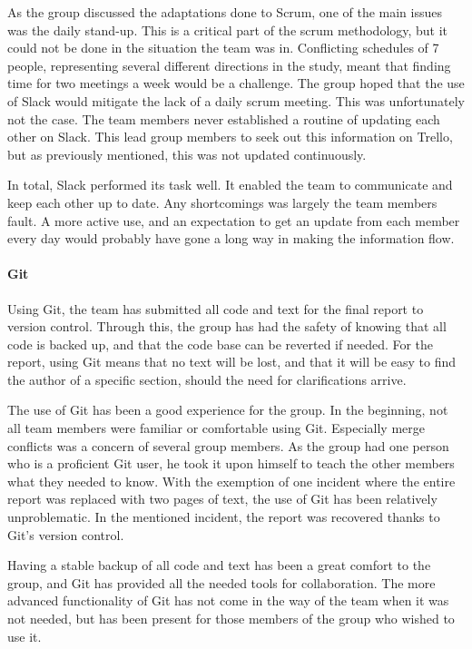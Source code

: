 \documentclass[11pt,a4paper,titlepage,oneside]{report}
\begin{document}
As the group discussed the adaptations done to Scrum, one of the main issues was the daily stand-up. This is a critical part of the scrum methodology, but it could not be done in the situation the team was in. Conflicting schedules of 7 people, representing several different directions in the study, meant that finding time for two meetings a week would be a challenge. The group hoped that the use of Slack would mitigate the lack of a daily scrum meeting. This was unfortunately not the case. The team members never established a routine of updating each other on Slack. This lead group members to seek out this information on Trello, but as previously mentioned, this was not updated continuously. 

In total, Slack performed its task well. It enabled the team to communicate and keep each other up to date. Any shortcomings was largely the team members fault. A more active use, and an expectation to get an update from each member every day would probably have gone a long way in making the information flow.

\paragraph{Git}
Using Git, the team has submitted all code and text for the final report to version control. Through this, the group has had the safety of knowing that all code is backed up, and that the code base can be reverted if needed. For the report, using Git means that no text will be lost, and that it will be easy to find the author of a specific section, should the need for clarifications arrive. 

The use of Git has been a good experience for the group. In the beginning, not all team members were familiar or comfortable using Git. Especially merge conflicts was a concern of several group members. As the group had one person who is a proficient Git user, he took it upon himself to teach the other members what they needed to know. With the exemption of one incident where the entire report was replaced with two pages of text, the use of Git has been relatively unproblematic. In the mentioned incident, the report was recovered thanks to Git's version control. 

Having a stable backup of all code and text has been a great comfort to the group, and Git has provided all the needed tools for collaboration. The more advanced functionality of Git has not come in the way of the team when it was not needed, but has been present for those members of the group who wished to use it.
\end{document}
